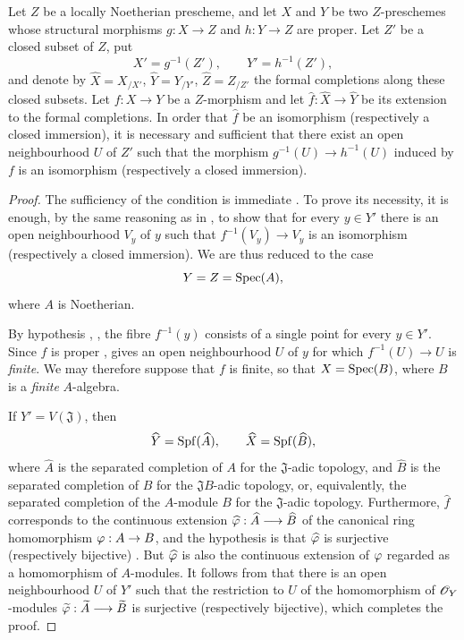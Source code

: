 \begin{proposition}[4.6.8]
\label{III.4.6.8}
Let $Z$ be a locally Noetherian prescheme, and let $X$ and $Y$ be
two $Z$-preschemes whose structural morphisms
$g:X\to Z$ and $h:Y\to Z$ are proper.  Let $Z'$ be a closed subset
of $Z$, put
\[
  X'=g^{-1}(Z'),\qquad Y'=h^{-1}(Z'),
\]
and denote by $\widehat X=X_{/X'}$, $\widehat Y=Y_{/Y'}$, $\widehat Z=Z_{/Z'}$
the formal completions along these closed subsets.  Let $f:X\to Y$
be a $Z$-morphism and let
$\widehat f:\widehat X\to\widehat Y$ be its extension to the formal
completions.  In order that $\widehat f$ be an isomorphism
(\textup{respectively} a closed immersion), it is necessary and sufficient
that there exist an open neighbourhood $U$ of $Z'$ such that the
morphism $g^{-1}(U)\longrightarrow h^{-1}(U)$
induced by $f$ is an isomorphism (\textup{respectively} a closed immersion).
\end{proposition}

\begin{proof}
The sufficiency of the condition is immediate
.  To prove its necessity, it is enough, by the
same reasoning as in , to show that for every
$y\in Y'$ there is an open neighbourhood $V_y$ of $y$ such that
$f^{-1}(V_y)\to V_y$ is an isomorphism (respectively a closed
immersion).  We are thus reduced to the case
\[
  Y=Z=\operatorname{Spec}(A),
\]
where $A$ is Noetherian.

By hypothesis , , the fibre
$f^{-1}(y)$ consists of a single point for every $y\in Y'$.  Since
$f$ is proper ,  gives an open
neighbourhood $U$ of $y$ for which $f^{-1}(U)\to U$ is \emph{finite}.  We
may therefore suppose that $f$ is finite, so that $X=\operatorname{Spec}(B)$,
where $B$ is a \emph{finite} $A$-algebra.

If $Y'=V(\mathfrak J)$, then
\[
  \widehat Y=\operatorname{Spf}(\widehat A),
  \qquad
  \widehat X=\operatorname{Spf}(\widehat B),
\]
where $\widehat A$ is the separated completion of $A$ for the
$\mathfrak J$-adic topology, and $\widehat B$ is the separated
completion of $B$ for the $\mathfrak JB$-adic topology, or,
equivalently, the separated completion of the $A$-module $B$ for
the $\mathfrak J$-adic topology.  Furthermore, $\widehat f$
corresponds to the continuous extension $\widehat{\varphi}:\widehat A\longrightarrow\widehat B$
of the canonical ring homomorphism $\varphi:A\to B$, and the
hypothesis is that $\widehat{\varphi}$ is surjective (respectively
bijective) .  But $\widehat{\varphi}$ is also the
continuous extension of $\varphi$ regarded as a homomorphism of
$A$-modules.  It follows from  that there is an
open neighbourhood $U$ of $Y'$ such that the restriction to $U$ of
the homomorphism of $\mathscr{O}_Y$-modules $\widetilde{\varphi}:\widetilde A\longrightarrow\widetilde B$
is surjective (respectively bijective), which completes the proof.
\end{proof}


